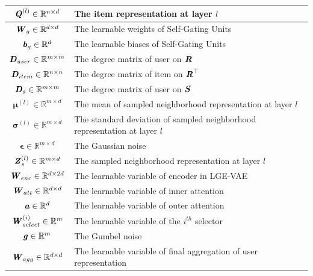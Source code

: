 \documentclass[letterpaper]{article} %
\begin{document}
\begin{supertabular}{c|p{5.7cm}}
     $\textbf{\textit{Q}}^{(l)}\in \mathbb{R}^{n\times d}$    &The item representation at layer $l$\\ \hline
     $\textbf{\textit{W}}_g\in \mathbb{R}^{d\times d}$    &The learnable weights of Self-Gating Units\\ \hline
     $\textbf{\textit{b}}_g\in \mathbb{R}^{d}$    &The learnable biases of Self-Gating Units\\ \hline
     $\textbf{\textit{D}}_{user}\in \mathbb{R}^{m\times m}$ &The degree matrix of user on $\textbf{\textit{R}}$\\ \hline
     $\textbf{\textit{D}}_{item}\in \mathbb{R}^{n\times n}$ &The degree matrix of item on $\textbf{\textit{R}}^{\top}$\\ \hline
     $\textbf{\textit{D}}_s\in \mathbb{R}^{m\times m}$    &The degree matrix of user on $\textbf{\textit{S}}$\\ \hline
     $\boldsymbol{\mu}^{(l)}\in \mathbb{R}^{m\times d}$   &The mean of sampled neighborhood representation at layer $l$\\ \hline
     $\boldsymbol{\sigma}^{(l)}\in \mathbb{R}^{m\times d}$    &The standard deviation of sampled neighborhood representation at layer $l$\\ \hline
     $\boldsymbol{\epsilon}\in \mathbb{R}^{m\times d}$    &The Gaussian noise\\ \hline
     $\textbf{\textit{Z}}_s^{(l)} \in \mathbb{R}^{m\times d}$  &The sampled neighborhood representation at layer $l$\\ \hline
     $\textbf{\textit{W}}_{enc}\in \mathbb{R}^{d\times 2d}$    &The learnable variable of encoder in LGE-VAE\\ \hline
     $\textbf{\textit{W}}_{att}\in \mathbb{R}^{d\times d}$    &The learnable variable of inner attention\\ \hline
     $\textbf{\textit{a}}\in \mathbb{R}^{d}$  &The learnable variable of outer attention\\ \hline
     $\textbf{\textit{W}}_{select}^{(i)}\in \mathbb{R}^m$   &The learnable variable of the $i^{th}$ selector\\ \hline
     $\textbf{\textit{g}}\in \mathbb{R}^m$  &The Gumbel noise\\ \hline
     $\textbf{\textit{W}}_{agg} \in \mathbb{R}^{d\times d}$ &The learnable variable of final aggregation of user representation\\ \hline
\end{supertabular}
\end{document}
